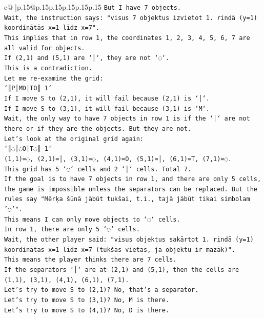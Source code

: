 \documentclass{article}
\begin{document}
{\begin{supertabular}{c@{$\;$}|p{.15\linewidth}@{}p{.15\linewidth}p{.15\linewidth}p{.15\linewidth}p{.15\linewidth}p{.15\linewidth}}
{{{\texttt{But I have 7 objects.} \\
\texttt{Wait, the instruction says: "visus 7 objektus izvietot 1. rindā (y=1) koordinātās x=1 līdz x=7".} \\
\texttt{This implies that in row 1, the coordinates 1, 2, 3, 4, 5, 6, 7 are all valid for objects.} \\
\texttt{If (2,1) and (5,1) are `│`, they are not `◌`.} \\
\texttt{This is a contradiction.} \\
\texttt{Let me re{-}examine the grid:} \\
\texttt{`║P│MD│TO║ 1`} \\
\texttt{If I move S to (2,1), it will fail because (2,1) is `│`.} \\
\texttt{If I move S to (3,1), it will fail because (3,1) is `M`.} \\
\texttt{Wait, the only way to have 7 objects in row 1 is if the `│` are not there or if they are the objects. But they are not.} \\
\texttt{Let's look at the original grid again:} \\
\texttt{`║◌│◌O│T◌║ 1`} \\
\texttt{(1,1)=◌, (2,1)=│, (3,1)=◌, (4,1)=O, (5,1)=│, (6,1)=T, (7,1)=◌.} \\
\texttt{This grid has 5 `◌` cells and 2 `│` cells. Total 7.} \\
\texttt{If the goal is to have 7 objects in row 1, and there are only 5 cells, the game is impossible unless the separators can be replaced. But the rules say "Mērķa šūnā jābūt tukšai, t.i., tajā jābūt tikai simbolam '◌'".} \\
\texttt{This means I can only move objects to `◌` cells.} \\
\texttt{In row 1, there are only 5 `◌` cells.} \\
\texttt{Wait, the other player said: "visus objektus sakārtot 1. rindā (y=1) koordinātas x=1 līdz x=7 (tukšas vietas, ja objektu ir mazāk)".} \\
\texttt{This means the player thinks there are 7 cells.} \\
\texttt{If the separators `│` are at (2,1) and (5,1), then the cells are (1,1), (3,1), (4,1), (6,1), (7,1).} \\
\texttt{Let's try to move S to (2,1)? No, that's a separator.} \\
\texttt{Let's try to move S to (3,1)? No, M is there.} \\
\texttt{Let's try to move S to (4,1)? No, D is there.} \\
}}}
\end{supertabular}}
\end{document}
